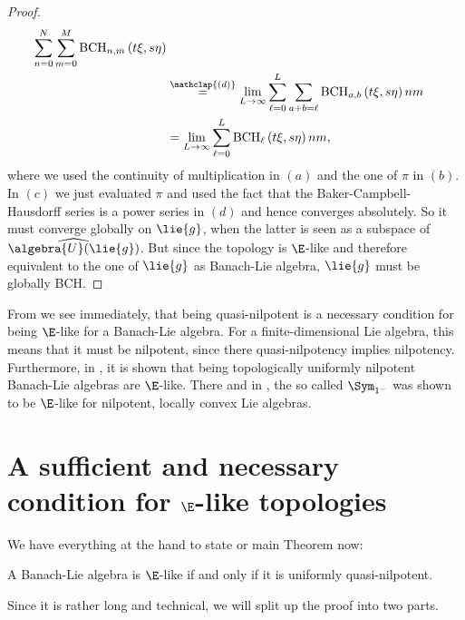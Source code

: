 \documentclass[
11pt,                          %
english                        %
]{article}
\newcommand{\bchpart}[3]{\mathrm{BCH}_{#1}\left(#2, #3\right)}
\newcommand{\bchparts}[4]{\mathrm{BCH}_{#1, #2}\left(#3, #4\right)}
\newcommand\ot[2]{\stackrel{\mathclap{#1}}{#2}}
\begin{document}
\begin{proof}
\begin{align*}
		\sum\limits_{n=0}^{N}
		\sum\limits_{m=0}^{M}
		\bchparts{n}{m}{t \xi}{s \eta}
		\\
		& \ot{(d)}{=}
		\lim_{L \rightarrow \infty}
		\sum\limits_{\ell=0}^{L}
		\sum\limits_{a + b = \ell}
		\bchparts{a}{b}{t \xi}{s \eta}{n}{m}
		\\
		& =
		\lim_{L \rightarrow \infty}
		\sum\limits_{\ell=0}^{L}
		\bchpart{\ell}{t \xi}{s \eta}{n}{m},
	\end{align*}
	where we used the continuity of multiplication in $(a)$ and the one of $\pi$ in 
	$(b)$. In $(c)$ we just evaluated $\pi$ and used the fact that the 
	Baker-Campbell-Hausdorff series is a power series in $(d)$ and hence converges 
	absolutely. So it must converge globally on $\lie{g}$, when the latter is seen 
	as a subspace of $\widehat{\algebra{U}(\lie{g})}$. But since the topology is 
	$\E$-like and therefore equivalent to the one of $\lie{g}$ as Banach-Lie 
	algebra, $\lie{g}$ must be globally BCH.
\end{proof}
From \cite{woj} we see immediately, that being quasi-nilpotent is a necessary 
condition for being $\E$-like for a Banach-Lie algebra. For a finite-dimensional 
Lie algebra, this means that it must be nilpotent, since there quasi-nilpotency 
implies nilpotency. Furthermore, in \cite{stapor:2015a}, it is shown that being 
topologically uniformly nilpotent Banach-Lie algebras are $\E$-like. There and in 
\cite{esposito.stapor.waldmann:2015a:pre}, the so called $\Sym_{1^-}$ was shown to 
be $\E$-like for nilpotent, locally convex Lie algebras.



\section{A sufficient and necessary condition for $\E$-like topologies}
\label{sec:MainProof}

We have everything at the hand to state or main Theorem now:
\begin{theorem}
	\label{Thm:Main}
	A Banach-Lie algebra is $\E$-like if and only if it is uniformly 
	quasi-nilpotent.
\end{theorem}
Since it is rather long and technical, we will split up the proof into two parts.
\end{document}

